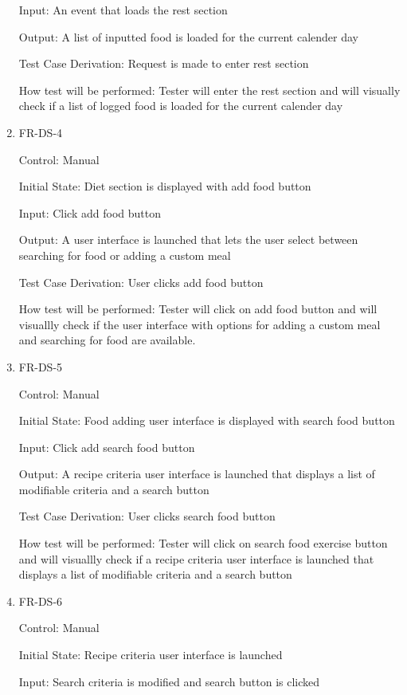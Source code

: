 \documentclass[12pt, titlepage]{article}
\begin{document}
\begin{enumerate}
Input: An event that loads the rest section
					
Output: A list of inputted food is loaded for the current calender day

Test Case Derivation: Request is made to enter rest section

How test will be performed: Tester will enter the rest section and will visually check if a list of logged food is loaded for the current calender day
					
\item{FR-DS-4 \\}

Control: Manual
					
Initial State: Diet section is displayed with add food button
					
Input: Click add food button
					
Output: A user interface is launched that lets the user select between searching for food or adding a custom meal

Test Case Derivation: User clicks add food button

How test will be performed: Tester will click on add food button and will visuallly check if the user interface with options for adding a custom meal and searching for food are available.

\item{FR-DS-5\\}

Control: Manual
					
Initial State: Food adding user interface is displayed with search food button
					
Input: Click add search food button
					
Output: A recipe criteria user interface is launched that displays a list of modifiable criteria and a search button

Test Case Derivation: User clicks search food button

How test will be performed: Tester will click on search food exercise button and will visuallly check if a recipe criteria user interface is launched that displays a list of modifiable criteria and a search button

\item{FR-DS-6\\}

Control: Manual
					
Initial State: Recipe criteria user interface is launched
					
Input: Search criteria is modified and search button is clicked
					

\end{enumerate}
\end{document}
